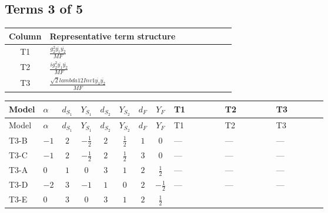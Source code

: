 \documentclass[8pt]{article}
\begin{document}
\begin{landscape}
\subsection*{Terms 3 of 5}
\begin{center}
\begin{tabular}{@{}c >{\raggedright\arraybackslash}p{0.82\linewidth}@{}}
\toprule
Column & Representative term structure \\
\midrule
T1 & \(\displaystyle \frac{g_{2}^{2} \overline{y_{1}} \overline{y_{2}}}{MF}\) \\
\midrule
T2 & \(\displaystyle \frac{i g_{2}^{2} \overline{y_{1}} \overline{y_{2}}}{MF}\) \\
\midrule
T3 & \(\displaystyle \frac{\sqrt{2} lambda12Inv1 \overline{y_{1}} \overline{y_{2}}}{MF}\) \\
\midrule
\bottomrule
\end{tabular}
\end{center}
\smallskip
\tiny
\begin{longtable}{@{}llcccccc >{\raggedright\arraybackslash}p{0.21\linewidth} >{\raggedright\arraybackslash}p{0.21\linewidth} >{\raggedright\arraybackslash}p{0.21\linewidth}@{}}
\toprule
Model & $\alpha$ & $d_{S_1}$ & $Y_{S_1}$ & $d_{S_2}$ & $Y_{S_2}$ & $d_F$ & $Y_F$ & T1 & T2 & T3 \\
\midrule
\endfirsthead
\toprule
Model & $\alpha$ & $d_{S_1}$ & $Y_{S_1}$ & $d_{S_2}$ & $Y_{S_2}$ & $d_F$ & $Y_F$ & T1 & T2 & T3 \\
\midrule
\endhead
T3-B & $-1$ & $2$ & $-\frac{1}{2}$ & $2$ & $\frac{1}{2}$ & $1$ & $0$ & --- & --- & --- \\
\midrule
T3-C & $-1$ & $2$ & $-\frac{1}{2}$ & $2$ & $\frac{1}{2}$ & $3$ & $0$ & --- & --- & --- \\
\midrule
T3-A & $0$ & $1$ & $0$ & $3$ & $1$ & $2$ & $\frac{1}{2}$ & --- & --- & --- \\
\midrule
T3-D & $-2$ & $3$ & $-1$ & $1$ & $0$ & $2$ & $-\frac{1}{2}$ & --- & --- & --- \\
\midrule
T3-E & $0$ & $3$ & $0$ & $3$ & $1$ & $2$ & $\frac{1}{2}$ & \scriptsize\adjustbox{max width=\linewidth}{$\begin{gathered} \frac{g_{2}^{2} \overline{y_{1}} \overline{y_{2}}}{2 MF}\end{gathered}$} & \scriptsize\adjustbox{max width=\linewidth}{$\begin{gathered} - \frac{i g_{2}^{2} \overline{y_{1}} \overline{y_{2}}}{2 MF}\end{gathered}$} & \scriptsize\adjustbox{max width=\linewidth}{$\begin{gathered} - \frac{\sqrt{2} lambda12Inv1 \overline{y_{1}} \overline{y_{2}}}{4 MF}\end{gathered}$} \\
\midrule
\bottomrule
\end{longtable}
\clearpage

\end{landscape}
\end{document}
